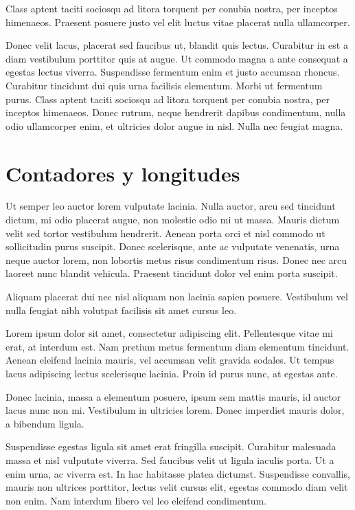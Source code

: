 \documentclass[12pt,a4paper]{report}
\begin{document}
Class aptent taciti sociosqu ad litora torquent per conubia nostra, per inceptos himenaeos. Praesent posuere justo vel elit luctus vitae placerat nulla ullamcorper.

Donec velit lacus, placerat sed faucibus ut, blandit quis lectus. Curabitur in est a diam vestibulum porttitor quis at augue. Ut commodo magna a ante consequat a egestas lectus viverra. Suspendisse fermentum enim et justo accumsan rhoncus. Curabitur tincidunt dui quis urna facilisis elementum. Morbi ut fermentum purus. Class aptent taciti sociosqu ad litora torquent per conubia nostra, per inceptos himenaeos. Donec rutrum, neque hendrerit dapibus condimentum, nulla odio ullamcorper enim, et ultricies dolor augue in nisl. Nulla nec feugiat magna. 





\section{Contadores y longitudes}
\label{seccion.contadores}



Ut semper leo auctor lorem vulputate lacinia. Nulla auctor, arcu sed tincidunt dictum, mi odio placerat augue, non molestie odio mi ut massa. Mauris dictum velit sed tortor vestibulum hendrerit. Aenean porta orci et nisl commodo ut sollicitudin purus suscipit. Donec scelerisque, ante ac vulputate venenatis, urna neque auctor lorem, non lobortis metus risus condimentum risus. Donec nec arcu laoreet nunc blandit vehicula. Praesent tincidunt dolor vel enim porta suscipit. 

Aliquam placerat dui nec nisl aliquam non lacinia sapien posuere. Vestibulum vel nulla feugiat nibh volutpat facilisis sit amet cursus leo.

Lorem ipsum dolor sit amet, consectetur adipiscing elit. Pellentesque vitae mi erat, at interdum est. Nam pretium metus fermentum diam elementum tincidunt. Aenean eleifend lacinia mauris, vel accumsan velit gravida sodales. Ut tempus lacus adipiscing lectus scelerisque lacinia. Proin id purus nunc, at egestas ante. 

Donec lacinia, massa a elementum posuere, ipsum sem mattis mauris, id auctor lacus nunc non mi. Vestibulum in ultricies lorem. Donec imperdiet mauris dolor, a bibendum ligula.

Suspendisse egestas ligula sit amet erat fringilla suscipit. Curabitur malesuada massa et nisl vulputate viverra. Sed faucibus velit ut ligula iaculis porta. Ut a enim urna, ac viverra est. In hac habitasse platea dictumst. Suspendisse convallis, mauris non ultrices porttitor, lectus velit cursus elit, egestas commodo diam velit non enim. Nam interdum libero vel leo eleifend condimentum. 
\end{document}
